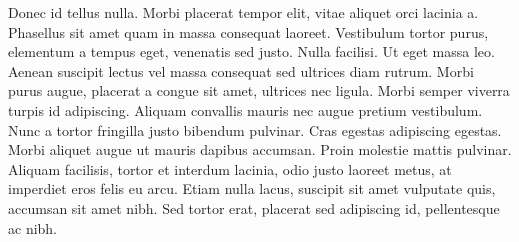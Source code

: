 \documentclass[twocolumn]{article}
\begin{document}
Donec id tellus nulla. Morbi placerat tempor elit, vitae aliquet orci lacinia a. Phasellus sit amet quam in massa consequat laoreet. Vestibulum tortor purus, elementum a tempus eget, venenatis sed justo. Nulla facilisi. Ut eget massa leo. Aenean suscipit lectus vel massa consequat sed ultrices diam rutrum. Morbi purus augue, placerat a congue sit amet, ultrices nec ligula. Morbi semper viverra turpis id adipiscing. Aliquam convallis mauris nec augue pretium vestibulum. Nunc a tortor fringilla justo bibendum pulvinar. Cras egestas adipiscing egestas. Morbi aliquet augue ut mauris dapibus accumsan. Proin molestie mattis pulvinar. Aliquam facilisis, tortor et interdum lacinia, odio justo laoreet metus, at imperdiet eros felis eu arcu. Etiam nulla lacus, suscipit sit amet vulputate quis, accumsan sit amet nibh. Sed tortor erat, placerat sed adipiscing id, pellentesque ac nibh.
\end{document}
